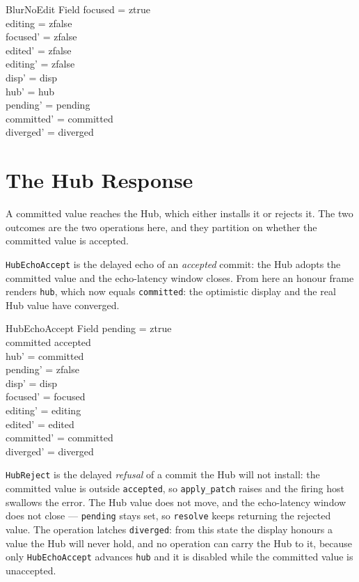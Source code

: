 \documentclass[a4paper,10pt,fleqn]{article}
\begin{document}
\begin{schema}{BlurNoEdit}
  \Delta Field
\where
  focused = ztrue \\
  editing = zfalse \\
  focused' = zfalse \\
  edited' = zfalse \\
  editing' = zfalse \\
  disp' = disp \\
  hub' = hub \\
  pending' = pending \\
  committed' = committed \\
  diverged' = diverged
\end{schema}

\section{The Hub Response}

A committed value reaches the Hub, which either installs it or rejects it.  The
two outcomes are the two operations here, and they partition on whether the
committed value is accepted.

\texttt{HubEchoAccept} is the delayed echo of an \emph{accepted} commit: the Hub
adopts the committed value and the echo-latency window closes.  From here an
honour frame renders \texttt{hub}, which now equals \texttt{committed}: the
optimistic display and the real Hub value have converged.

\begin{schema}{HubEchoAccept}
  \Delta Field
\where
  pending = ztrue \\
  committed \in accepted \\
  hub' = committed \\
  pending' = zfalse \\
  disp' = disp \\
  focused' = focused \\
  editing' = editing \\
  edited' = edited \\
  committed' = committed \\
  diverged' = diverged
\end{schema}

\texttt{HubReject} is the delayed \emph{refusal} of a commit the Hub will not
install: the committed value is outside \texttt{accepted}, so \texttt{apply\_patch}
raises and the firing host swallows the error.  The Hub value does not move, and
the echo-latency window does not close --- \texttt{pending} stays set, so
\texttt{resolve} keeps returning the rejected value.  The operation latches
\texttt{diverged}: from this state the display honours a value the Hub will never
hold, and no operation can carry the Hub to it, because only
\texttt{HubEchoAccept} advances \texttt{hub} and it is disabled while the committed
value is unaccepted.
\end{document}
